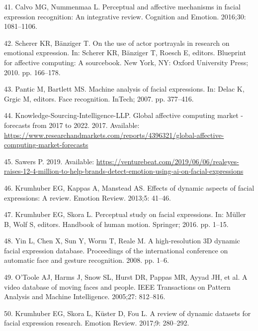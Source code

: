 \documentclass[10pt,letterpaper]{article}
\begin{document}
\leavevmode\hypertarget{ref-calvo2016perceptual}{}%
41. Calvo MG, Nummenmaa L. Perceptual and affective mechanisms in facial expression recognition: An integrative review. Cognition and Emotion. 2016;30: 1081--1106.

\leavevmode\hypertarget{ref-scherer2010use}{}%
42. Scherer KR, Bänziger T. On the use of actor portrayals in research on emotional expression. In: Scherer KR, Bänziger T, Roesch E, editors. Blueprint for affective computing: A sourcebook. New York, NY: Oxford University Press; 2010. pp. 166--178.

\leavevmode\hypertarget{ref-pantic2007machine}{}%
43. Pantic M, Bartlett MS. Machine analysis of facial expressions. In: Delac K, Grgic M, editors. Face recognition. InTech; 2007. pp. 377--416.

\leavevmode\hypertarget{ref-knowledge2019global}{}%
44. Knowledge-Sourcing-Intelligence-LLP. Global affective computing market - forecasts from 2017 to 2022. 2017. Available: \url{https://www.researchandmarkets.com/reports/4396321/global-affective-computing-market-forecasts}

\leavevmode\hypertarget{ref-sawers2019realeyes}{}%
45. Sawers P. 2019. Available: \url{https://venturebeat.com/2019/06/06/realeyes-raises-12-4-million-to-help-brands-detect-emotion-using-ai-on-facial-expressions}

\leavevmode\hypertarget{ref-krumhuber2013effects}{}%
46. Krumhuber EG, Kappas A, Manstead AS. Effects of dynamic aspects of facial expressions: A review. Emotion Review. 2013;5: 41--46.

\leavevmode\hypertarget{ref-krumhuber2016perceptual}{}%
47. Krumhuber EG, Skora L. Perceptual study on facial expressions. In: Müller B, Wolf S, editors. Handbook of human motion. Springer; 2016. pp. 1--15.

\leavevmode\hypertarget{ref-yin2008high}{}%
48. Yin L, Chen X, Sun Y, Worm T, Reale M. A high-resolution 3D dynamic facial expression database. Proceedings of the international conference on automatic face and gesture recognition. 2008. pp. 1--6.

\leavevmode\hypertarget{ref-o2005video}{}%
49. O'Toole AJ, Harms J, Snow SL, Hurst DR, Pappas MR, Ayyad JH, et al. A video database of moving faces and people. IEEE Transactions on Pattern Analysis and Machine Intelligence. 2005;27: 812--816.

\leavevmode\hypertarget{ref-krumhuber2017review}{}%
50. Krumhuber EG, Skora L, Küster D, Fou L. A review of dynamic datasets for facial expression research. Emotion Review. 2017;9: 280--292.
\end{document}
